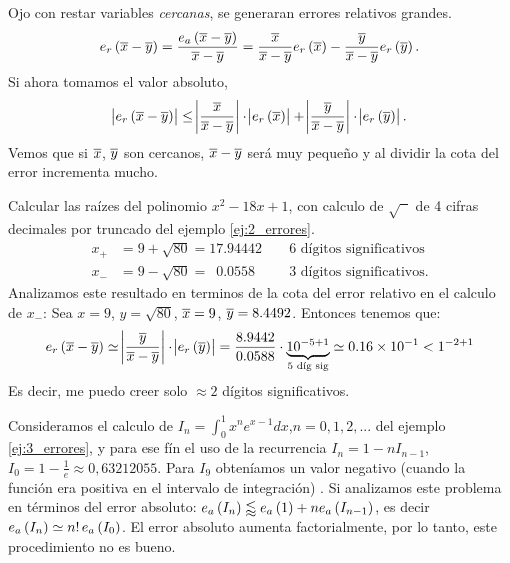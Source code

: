 \begin{obs}
    Ojo con restar variables \emph{cercanas}, se generaran errores relativos grandes.
    \[
	e_r\left( \overline{x}-\overline{y}\right)  = \dfrac{e_a\left( \overline{x} - \overline{y}\right) }{\overline{x}-\overline{y}} = \dfrac{\overline{x}}{\overline{x}-\overline{y}}e_r\left( \overline{x}\right)  - \dfrac{\overline{y}}{\overline{x}-\overline{y}}e_r\left( \overline{y}\right).
    \]
    Si ahora tomamos el valor absoluto,
    \[
	\abs{e_r\left( \overline{x}-\overline{y}\right)} \leq \abs{\dfrac{\overline{x}}{\overline{x}-\overline{y}}}\cdot\abs{e_r\left( \overline{x}\right)} + \abs{\dfrac{\overline{y}}{\overline{x}-\overline{y}}}\cdot\abs{e_r\left( \overline{y}\right)}.
    \]
    Vemos que si $\overline{x}$, $\overline{y}$ son cercanos, $\overline{x}-\overline{y}$ será muy pequeño y al dividir la cota del error incrementa mucho.
\end{obs}

\begin{example}
	Calcular las raízes del polinomio  $x^2 - 18x + 1$, con calculo de $\sqrt{\phantom{x}}$ de 4 cifras decimales por truncado del ejemplo \ref{ej:2_errores}.
	\begin{align*}
		x_+ &= 9 + \sqrt{80} = 17.94442 &&\text{ 6 dígitos significativos} \\
		x_- &= 9 - \sqrt{80} = \enspace 0.0558 &&\text{ 3 dígitos significativos}.
	\end{align*}
	Analizamos este resultado en terminos de la cota del error relativo en el calculo de $x_-$: Sea $x = 9$, $y = \sqrt{80}$, $\overline{x}=9$, $\overline{y}=8.4492$. Entonces tenemos que:
	\[
		e_r\left( \overline{x}-\overline{y}\right)  \simeq \abs{\frac{\overline{y}}{\overline{x}-\overline{y}}}\cdot\abs{e_r\left( \overline{y}\right)} = \dfrac{8.9442}{0.0588}\cdot \underbrace{10^{-5+1}}_{\text{5 díg sig}} \simeq \SI{0.16e-1}{} < 1^{-2+1}
	\]
	Es decir, me puedo creer solo $\approx 2$ dígitos significativos.
\end{example}

\begin{example}
	Consideramos el calculo de $I_n = \int_{0}^{1}x^ne^{x-1}dx$,$n = 0,1,2,...$ del ejemplo \ref{ej:3_errores}, y para ese fín el uso de la recurrencia $I_n = 1 - nI_{n-1}$, $I_0 = 1 - \frac{1}{e} \approx 0,63212055$. Para $I_9$ obteníamos un valor negativo (cuando la función era positiva en el intervalo de integración) . Si analizamos este problema en términos del error absoluto: $e_a\left( I_n\right)  \lessapprox e_a\left( 1\right)  + ne_a\left( I_{n-1}\right) $, es decir $e_a\left( I_n\right)  \simeq n!\,e_a\left( I_0\right) $. El error absoluto aumenta factorialmente, por lo tanto, este procedimiento no es bueno.
\end{example}

